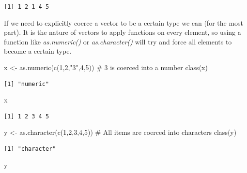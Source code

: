 \documentclass[
  letterpaper,
  DIV=11,
  numbers=noendperiod]{scrreprt}
\newenvironment{Shaded}{\begin{snugshade}}{\end{snugshade}}
\newcommand{\CommentTok}[1]{\textcolor[rgb]{0.37,0.37,0.37}{#1}}
\newcommand{\DecValTok}[1]{\textcolor[rgb]{0.68,0.00,0.00}{#1}}
\newcommand{\FunctionTok}[1]{\textcolor[rgb]{0.28,0.35,0.67}{#1}}
\newcommand{\NormalTok}[1]{\textcolor[rgb]{0.00,0.23,0.31}{#1}}
\newcommand{\OtherTok}[1]{\textcolor[rgb]{0.00,0.23,0.31}{#1}}
\newcommand{\StringTok}[1]{\textcolor[rgb]{0.13,0.47,0.30}{#1}}
\begin{document}
\begin{verbatim}
[1] 1 2 1 4 5
\end{verbatim}

If we need to explicitly coerce a vector to be a certain type we can
(for the most part). It is the nature of vectors to apply functions on
every element, so using a function like \emph{as.numeric()} or
\emph{as.character()} will try and force all elements to become a
certain type.

\begin{Shaded}
\begin{Highlighting}[]
\NormalTok{x }\OtherTok{\textless{}{-}} \FunctionTok{as.numeric}\NormalTok{(}\FunctionTok{c}\NormalTok{(}\DecValTok{1}\NormalTok{,}\DecValTok{2}\NormalTok{,}\StringTok{"3"}\NormalTok{,}\DecValTok{4}\NormalTok{,}\DecValTok{5}\NormalTok{)) }\CommentTok{\# 3 is coerced into a number}
\FunctionTok{class}\NormalTok{(x)}
\end{Highlighting}
\end{Shaded}

\begin{verbatim}
[1] "numeric"
\end{verbatim}

\begin{Shaded}
\begin{Highlighting}[]
\NormalTok{x}
\end{Highlighting}
\end{Shaded}

\begin{verbatim}
[1] 1 2 3 4 5
\end{verbatim}

\begin{Shaded}
\begin{Highlighting}[]
\NormalTok{y }\OtherTok{\textless{}{-}} \FunctionTok{as.character}\NormalTok{(}\FunctionTok{c}\NormalTok{(}\DecValTok{1}\NormalTok{,}\DecValTok{2}\NormalTok{,}\DecValTok{3}\NormalTok{,}\DecValTok{4}\NormalTok{,}\DecValTok{5}\NormalTok{)) }\CommentTok{\# All items are coerced into characters}
\FunctionTok{class}\NormalTok{(y)}
\end{Highlighting}
\end{Shaded}

\begin{verbatim}
[1] "character"
\end{verbatim}

\begin{Shaded}
\begin{Highlighting}[]
\NormalTok{y}
\end{Highlighting}
\end{Shaded}
\end{document}
